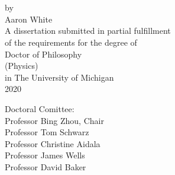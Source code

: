 \begin{titlepage}

\begin{center}
\phantom{x}\\
\vspace{10em}
\textbf{\Large\titleName}\\
\vspace{5em}
by\\
Aaron White\\
\vspace{5em}
A dissertation submitted in partial fulfillment\\
of the requirements for the degree of\\
Doctor of Philosophy\\
(Physics)\\
in The University of Michigan\\
2020\\
\end{center} 

\vspace{5em}
\noindent Doctoral Comittee:\\
\phantom{xxxx} Professor Bing Zhou, Chair \\
\phantom{xxxx} Professor Tom Schwarz\\
\phantom{xxxx} Professor Christine Aidala\\
\phantom{xxxx} Professor James Wells\\
\phantom{xxxx} Professor David Baker\\

\end{titlepage}
